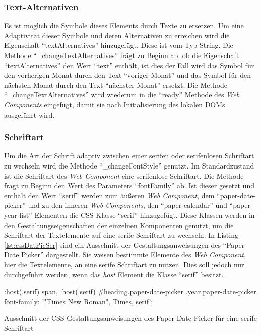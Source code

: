 \documentclass[12pt, paper=a4, bibtotoc, toc=listof, headsepline=true]{scrreprt}
\begin{document}
		\subsubsection{Text-Alternativen}
		Es ist möglich die Symbole dieses Elements durch Texte zu ersetzen. Um eine Adaptivität dieser Symbole und deren Alternativen zu erreichen wird die Eigenschaft \enquote{textAlternatives} hinzugefügt. Diese ist vom Typ String. Die Methode \enquote{\_changeTextAlternatives} frägt zu Beginn ab, ob die Eigenschaft \enquote{textAlternatives} den Wert \enquote{text} enthält, ist dies der Fall wird das Symbol für den vorherigen Monat durch den Text \enquote{voriger Monat} und das Symbol für den nächsten Monat durch den Text \enquote{nächster Monat} ersetzt. Die Methode \enquote{\_changeTextAlternatives} wird wiederum in die \enquote{ready} Methode des \emph{Web Components} eingefügt, damit sie nach Initialisierung des lokalen \ac{DOM}s ausgeführt wird. 
		\subsubsection{Schriftart}
		Um die Art der Schrift adaptiv zwischen einer serifen oder serifenlosen Schriftart zu wechseln wird die Methode \enquote{\_changeFontStyle} genutzt. Im Standardzustand ist die Schriftart des \emph{Web Component} eine serifenlose Schriftart. Die Methode fragt zu Beginn den Wert des Parameters \enquote{fontFamily} ab. Ist dieser gesetzt und enthält den Wert \enquote{serif} werden zum äußeren \emph{Web Component}, dem \enquote{paper-date-picker} und zu den inneren \emph{Web Components}, den \enquote{paper-calendar} und \enquote{paper-year-list} Elementen die \ac{CSS} Klasse \enquote{serif} hinzugefügt. Diese Klassen werden in den Gestaltungseigenschaften der einzelnen Komponenten genutzt, um die Schriftart der Textelemente auf eine serife Schriftart zu wechseln. In Listing \ref{lst:cssDatPicSer} sind ein Ausschnitt der Gestaltungsanweisungen des \enquote{Paper Date Picker} dargestellt. Sie weisen bestimmte Elemente des \emph{Web Component}, hier die Textelemente, an eine serife Schriftart zu nutzen. Dies soll jedoch nur durchgeführt werden, wenn das \emph{host} Element die Klasse \enquote{serif} besitzt.
		\begin{listing}
			\begin{CSScode*}{}
:host(.serif) span, :host(.serif) #heading.paper-date-picker .year.paper-date-picker{
   font-family: '"Times New Roman", Times, serif';
}
			\end{CSScode*}
			\caption[CSS des Paper Date Picker für serife Schriftart]{Ausschnitt der CSS Gestaltungsanweisungen des Paper Date Picker für eine serife Schriftart}
			\label{lst:cssDatPicSer}
		\end{listing}
\end{document}

